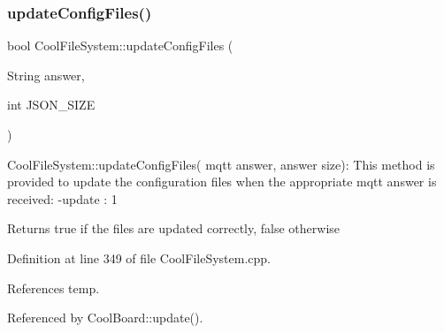\subsubsection{\texorpdfstring{update\+Config\+Files()}{updateConfigFiles()}}
{\footnotesize\ttfamily bool Cool\+File\+System\+::update\+Config\+Files (\begin{DoxyParamCaption}\item[{String}]{answer,  }\item[{int}]{J\+S\+O\+N\+\_\+\+S\+I\+ZE }\end{DoxyParamCaption})}

Cool\+File\+System\+::update\+Config\+Files( mqtt answer, answer size)\+: This method is provided to update the configuration files when the appropriate mqtt answer is received\+: -\/update \+: 1

\begin{DoxyReturn}{Returns}
true if the files are updated correctly, false otherwise 
\end{DoxyReturn}


Definition at line 349 of file Cool\+File\+System.\+cpp.



References temp.



Referenced by Cool\+Board\+::update().



